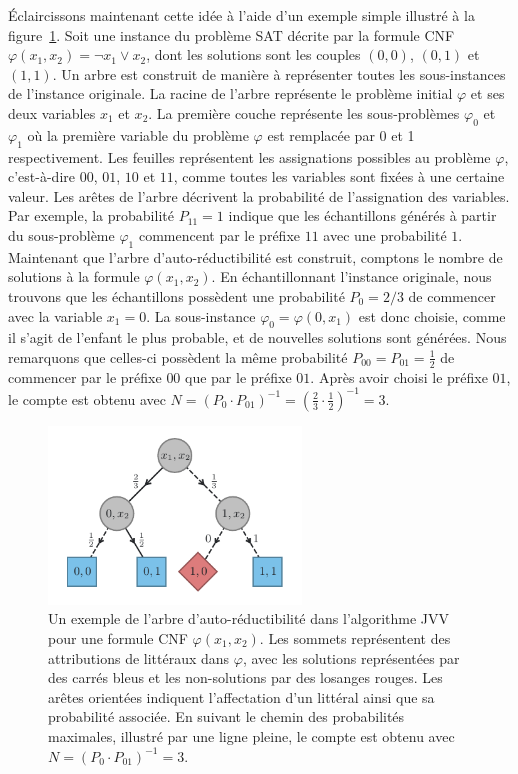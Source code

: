 Éclaircissons maintenant cette idée à l'aide d'un exemple simple illustré à la figure~\ref{fig:algorithme-jvv}. Soit une instance du problème SAT décrite par la formule CNF $\varphi(x_{1}, x_{2}) = \neg x_{1} \lor x_{2}$, dont les solutions sont les couples $(0,0)$, $(0,1)$ et $(1,1)$. Un arbre est construit de manière à représenter toutes les sous-instances de l'instance originale. La racine de l'arbre représente le problème initial $\varphi$ et ses deux variables $x_{1}$ et $x_{2}$. La première couche représente les sous-problèmes $\varphi_{0}$ et $\varphi_{1}$ où la première variable du problème $\varphi$ est remplacée par 0 et 1 respectivement. Les feuilles représentent les assignations possibles au problème $\varphi$, c'est-à-dire $00$, $01$, $10$ et $11$, comme toutes les variables sont fixées à une certaine valeur. Les arêtes de l'arbre décrivent la probabilité de l'assignation des variables. Par exemple, la probabilité $P_{11}=1$ indique que les échantillons générés à partir du sous-problème $\varphi_{1}$ commencent par le préfixe $11$ avec une probabilité $1$. Maintenant que l'arbre d'auto-réductibilité est construit, comptons le nombre de solutions à la formule $\varphi(x_{1}, x_{2})$. En échantillonnant l'instance originale, nous trouvons que les échantillons possèdent une probabilité $P_{0}=2/3$ de commencer avec la variable $x_{1} = 0$. La sous-instance $\varphi_{0} = \varphi(0, x_{1})$ est donc choisie, comme il s'agit de l'enfant le plus probable, et de nouvelles solutions sont générées. Nous remarquons que celles-ci possèdent la même probabilité $P_{00} = P_{01} =\frac{1}{2}$ de commencer par le préfixe $00$ que par le préfixe $01$. Après avoir choisi le préfixe $01$, le compte est obtenu avec $N = (P_{0} \cdot P_{01})^{-1} = (\frac{2}{3} \cdot \frac{1}{2})^{-1} = 3$.

\begin{figure}[h]
    \centering
    \includegraphics[width=0.6\textwidth]{figures/jvv-algorithm.pdf}
    \caption[Algorithme de Jerrum-Valiant-Vazirani]{Un exemple de l'arbre d'auto-réductibilité dans l'algorithme JVV pour une formule CNF $\varphi(x_{1}, x_{2})$. Les sommets représentent des attributions de littéraux dans $\varphi$, avec les solutions représentées par des carrés bleus et les non-solutions par des losanges rouges. Les arêtes orientées indiquent l'affectation d'un littéral ainsi que sa probabilité associée. En suivant le chemin des probabilités maximales, illustré par une ligne pleine, le compte est obtenu avec $N = (P_{0} \cdot P_{01})^{-1} = 3$.}
    \label{fig:algorithme-jvv}
\end{figure}

